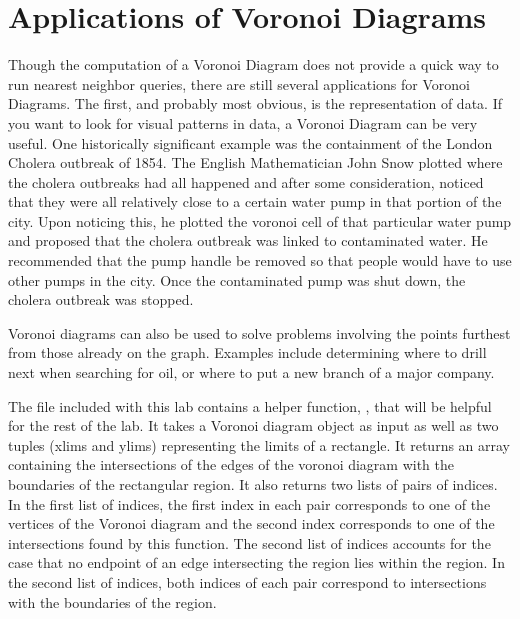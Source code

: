 \section*{Applications of Voronoi Diagrams}

Though the computation of a Voronoi Diagram does not provide a quick way to run nearest neighbor queries, there are still several applications for Voronoi Diagrams.
The first, and probably most obvious, is the representation of data.
If you want to look for visual patterns in data, a Voronoi Diagram can be very useful.
One historically significant example was the containment of the London Cholera outbreak of 1854.
The English Mathematician John Snow plotted where the cholera outbreaks had all happened and after some consideration, noticed that they were all relatively close to a certain water pump in that portion of the city.
Upon noticing this, he plotted the voronoi cell of that particular water pump and proposed that the cholera outbreak was linked to contaminated water.
He recommended that the pump handle be removed so that people would have to use other pumps in the city.
Once the contaminated pump was shut down, the cholera outbreak was stopped.

Voronoi diagrams can also be used to solve problems involving the points furthest from those already on the graph.
Examples include determining where to drill next when searching for oil, or where to put a new branch of a major company.

The file  included with this lab contains a helper function, , that will be helpful for the rest of the lab.
It takes a Voronoi diagram object as input as well as two tuples (xlims and ylims) representing the limits of a rectangle.
It returns an array containing the intersections of the edges of the voronoi diagram with the boundaries of the rectangular region.
It also returns two lists of pairs of indices.
In the first list of indices, the first index in each pair corresponds to one of the vertices of the Voronoi diagram and the second index corresponds to one of the intersections found by this function.
The second list of indices accounts for the case that no endpoint of an edge intersecting the region lies within the region.
In the second list of indices, both indices of each pair correspond to intersections with the boundaries of the region.

